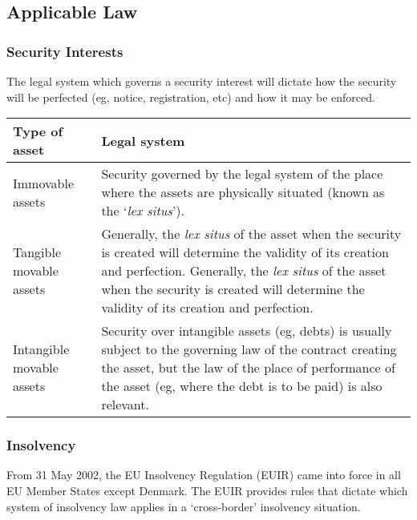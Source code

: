\documentclass[
]{article}
\begin{document}
\hypertarget{applicable-law}{%
\subsection{Applicable Law}\label{applicable-law}}

\hypertarget{security-interests}{%
\subsubsection{Security Interests}\label{security-interests}}

The legal system which governs a security interest will dictate how the
security will be perfected (eg, notice, registration, etc) and how it
may be enforced.

\begin{longtable}[]{@{}ll@{}}
\toprule()
Type of asset & Legal system \\
\midrule()
\endhead
Immovable assets & Security governed by the legal system of the place
where the assets are physically situated (known as the `\emph{lex
situs}'). \\
Tangible movable assets & Generally, the \emph{lex situs} of the asset
when the security is created will determine the validity of its creation
and perfection. Generally, the \emph{lex situs} of the asset when the
security is created will determine the validity of its creation and
perfection. \\
Intangible movable assets & Security over intangible assets (eg, debts)
is usually subject to the governing law of the contract creating the
asset, but the law of the place of performance of the asset (eg, where
the debt is to be paid) is also relevant. \\
\bottomrule()
\end{longtable}

\hypertarget{insolvency}{%
\subsubsection{Insolvency}\label{insolvency}}

From 31 May 2002, the EU Insolvency Regulation (EUIR) came into force in
all EU Member States except Denmark. The EUIR provides rules that
dictate which system of insolvency law applies in a `cross-border'
insolvency situation.
\end{document}
